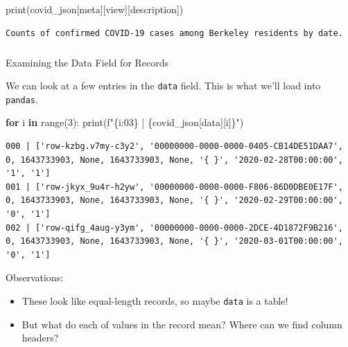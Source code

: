 \documentclass[
  letterpaper,
  DIV=11,
  numbers=noendperiod]{scrreprt}
\makeatletter
\let\oldsubparagraph\subparagraph
\renewcommand{\subparagraph}{
    \@ifstar
      \xxxSubParagraphStar
      \xxxSubParagraphNoStar
  }
\newcommand{\xxxSubParagraphStar}[1]{\oldsubparagraph*{#1}\mbox{}}
\newcommand{\xxxSubParagraphNoStar}[1]{\oldsubparagraph{#1}\mbox{}}
\newenvironment{Shaded}{\begin{snugshade}}{\end{snugshade}}
\newcommand{\BuiltInTok}[1]{\textcolor[rgb]{0.00,0.23,0.31}{#1}}
\newcommand{\ControlFlowTok}[1]{\textcolor[rgb]{0.00,0.23,0.31}{\textbf{#1}}}
\newcommand{\DecValTok}[1]{\textcolor[rgb]{0.68,0.00,0.00}{#1}}
\newcommand{\KeywordTok}[1]{\textcolor[rgb]{0.00,0.23,0.31}{\textbf{#1}}}
\newcommand{\NormalTok}[1]{\textcolor[rgb]{0.00,0.23,0.31}{#1}}
\newcommand{\SpecialCharTok}[1]{\textcolor[rgb]{0.37,0.37,0.37}{#1}}
\newcommand{\SpecialStringTok}[1]{\textcolor[rgb]{0.13,0.47,0.30}{#1}}
\newcommand{\StringTok}[1]{\textcolor[rgb]{0.13,0.47,0.30}{#1}}
\providecommand{\tightlist}{%
  \setlength{\itemsep}{0pt}\setlength{\parskip}{0pt}}\usepackage{longtable,booktabs,array}
\makeatother
\begin{document}
\begin{Shaded}
\begin{Highlighting}[]
\BuiltInTok{print}\NormalTok{(covid\_json[}\StringTok{\textquotesingle{}meta\textquotesingle{}}\NormalTok{][}\StringTok{\textquotesingle{}view\textquotesingle{}}\NormalTok{][}\StringTok{\textquotesingle{}description\textquotesingle{}}\NormalTok{])}
\end{Highlighting}
\end{Shaded}

\begin{verbatim}
Counts of confirmed COVID-19 cases among Berkeley residents by date.
\end{verbatim}

\subparagraph{Examining the Data Field for
Records}\label{examining-the-data-field-for-records}

We can look at a few entries in the \texttt{data} field. This is what
we'll load into \texttt{pandas}.

\begin{Shaded}
\begin{Highlighting}[]
\ControlFlowTok{for}\NormalTok{ i }\KeywordTok{in} \BuiltInTok{range}\NormalTok{(}\DecValTok{3}\NormalTok{):}
    \BuiltInTok{print}\NormalTok{(}\SpecialStringTok{f"}\SpecialCharTok{\{}\NormalTok{i}\SpecialCharTok{:03\}}\SpecialStringTok{ | }\SpecialCharTok{\{}\NormalTok{covid\_json[}\StringTok{\textquotesingle{}data\textquotesingle{}}\NormalTok{][i]}\SpecialCharTok{\}}\SpecialStringTok{"}\NormalTok{)}
\end{Highlighting}
\end{Shaded}

\begin{verbatim}
000 | ['row-kzbg.v7my-c3y2', '00000000-0000-0000-0405-CB14DE51DAA7', 0, 1643733903, None, 1643733903, None, '{ }', '2020-02-28T00:00:00', '1', '1']
001 | ['row-jkyx_9u4r-h2yw', '00000000-0000-0000-F806-86D0DBE0E17F', 0, 1643733903, None, 1643733903, None, '{ }', '2020-02-29T00:00:00', '0', '1']
002 | ['row-qifg_4aug-y3ym', '00000000-0000-0000-2DCE-4D1872F9B216', 0, 1643733903, None, 1643733903, None, '{ }', '2020-03-01T00:00:00', '0', '1']
\end{verbatim}

Observations:

\begin{itemize}
\tightlist
\item
  These look like equal-length records, so maybe \texttt{data} is a
  table!
\item
  But what do each of values in the record mean? Where can we find
  column headers?
\end{itemize}
\end{document}

